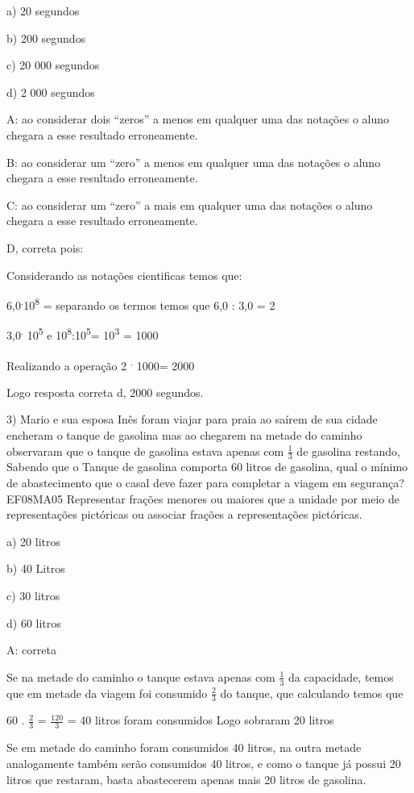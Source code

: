 {a) 20 segundos

b) 200 segundos

c) 20 000 segundos

d) 2 000 segundos

A: ao considerar dois ``zeros'' a menos em qualquer uma das notações o
aluno chegara a esse resultado erroneamente.

B: ao considerar um ``zero'' a menos em qualquer uma das notações o
aluno chegara a esse resultado erroneamente.

C: ao considerar um ``zero'' a mais em qualquer uma das notações o aluno
chegara a esse resultado erroneamente.

D, correta pois:

Considerando as notações cientificas temos que:

6,0\textsuperscript{.}10\textsuperscript{8} = separando os termos temos
que 6,0 : 3,0 = 2

3,0\textsuperscript{.} 10\textsuperscript{5} e
10\textsuperscript{8}:10\textsuperscript{5}= 10\textsuperscript{3} =
1000

Realizando a operação 2 \textsuperscript{.} 1000= 2000

Logo resposta correta d, 2000 segundos.

3) Mario e sua esposa Inês foram viajar para praia ao saírem de sua
cidade encheram o tanque de gasolina mas ao chegarem na metade do
caminho observaram que o tanque de gasolina estava apenas com
\(\frac{1}{3}\) de gasolina restando, Sabendo que o Tanque de gasolina
comporta 60 litros de gasolina, qual o mínimo de abastecimento que o
casal deve fazer para completar a viagem em segurança? EF08MA05
Representar frações menores ou maiores que a unidade por meio de
representações pictóricas ou associar frações a representações
pictóricas.

a) 20 litros

b) 40 Litros

c) 30 litros

d) 60 litros

A: correta

Se na metade do caminho o tanque estava apenas com \(\frac{1}{3}\) da
capacidade, temos que em metade da viagem foi consumido \(\frac{2}{3}\)
do tanque, que calculando temos que

60 . \(\frac{2}{3}\) = \(\frac{120}{3}\) = 40 litros foram consumidos
Logo sobraram 20 litros

Se em metade do caminho foram consumidos 40 litros, na outra metade
analogamente também serão consumidos 40 litros, e como o tanque já
possui 20 litros que restaram, basta abastecerem apenas mais 20 litros
de gasolina.

}
